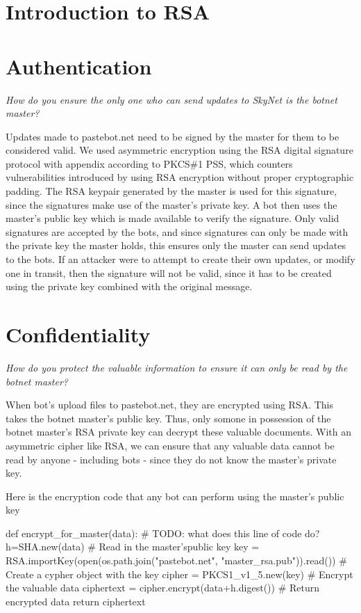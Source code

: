 \documentclass[9pt,a4paper]{article}
\begin{document}
\maketitle
\small
\setlength{\parindent}{0pt}

\section{Introduction to RSA}

\section{Authentication}
\emph{How do you ensure the only one who can send updates to SkyNet is the botnet master?}

Updates made to pastebot.net need to be signed by the master for them to be considered valid. We used asymmetric encryption using the RSA digital signature protocol with appendix according to PKCS\#1 PSS, which counters vulnerabilities introduced by using RSA encryption without proper cryptographic padding. The RSA keypair generated by the master is used for this signature, since the signatures make use of the master's private key. A bot then uses the master's public key which is made available to verify the signature. Only valid signatures are accepted by the bots, and since signatures can only be made with the private key the master holds, this ensures only the master can send updates to the bots. If an attacker were to attempt to create their own updates, or modify one in transit, then the signature will not be valid, since it has to be created using the private key combined with the original message.

\section{Confidentiality}
\emph{How do you protect the valuable information to ensure it can only  be read by the botnet master?}

When bot's upload files to pastebot.net, they are encrypted using RSA. This takes the botnet master's public key. Thus, only somone in possession of the botnet master's RSA private key can decrypt these valuable documents. With an asymmetric cipher like RSA, we can ensure that any valuable data cannot be read by anyone - including bots - since they do not know the master's private key.

Here is the encryption code that any bot can perform using the master's public key
\begin{center}
\vspace{-2ex}
\begin{python}
def encrypt_for_master(data):
    # TODO: what does this line of code do?
    h=SHA.new(data)
    # Read in the master'spublic key
    key = RSA.importKey(open(os.path.join("pastebot.net", "master_rsa.pub")).read())
    # Create a cypher object with the key
    cipher = PKCS1_v1_5.new(key)
    # Encrypt the valuable data
    ciphertext = cipher.encrypt(data+h.digest())
    # Return encrypted data
    return ciphertext
\end{python}
\end{center}
\end{document}
